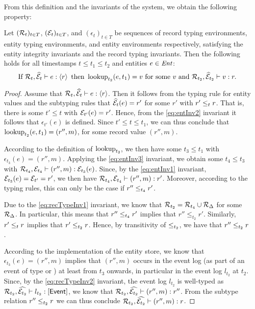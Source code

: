 From this definition and the invariants of the system, we obtain the
following property:
\begin{corollary}\label{cor:lookup}
  Let $({\mathcal R}_t)_{t\in T}$, $({\mathcal E}_t)_{t\in T}$, and
  $(\epsilon_t)_{t\in T}$ be sequences of record typing
  environments, entity typing environments, and entity environments
  respectively, satisfying the entity integrity invariants and the
  record typing invariants. Then the following holds for all
  timestamps $t \le t_1 \le t_2$ and entities $e \in \mathit{Ent}$:
  \[
  \text{If } {\mathcal R}_t, \widehat{{\mathcal E}}_t \vdash e : \left\langle r\right\rangle \text{
    then } \operatorname{lookup}_{t_2}(e,t_1) = v \text{ for some } v \text{ and
  } {\mathcal R}_{t_2}, \widehat{{\mathcal E}}_{t_2} \vdash v : r.
  \]
\end{corollary}
\begin{proof}
  Assume that ${\mathcal R}_t, \widehat{{\mathcal E}}_t \vdash e : \left\langle r\right\rangle$. Then
  it follows from the typing rule for entity values and the subtyping
  rules that $\widehat{{\mathcal E}}_t(e) = r'$ for some $r'$ with $r' \le_{t}
  r$. That is, there is some $t' \le t$ with ${\mathcal E}_{t'}(e) =
  r'$. Hence, from the \ref{eq:entInv2} invariant it follows that
  $\epsilon_{t'}(e)$ is defined. Since $t' \le t \le t_1$, we can thus
  conclude that $\operatorname{lookup}_{t_2}(e,t_1) = (r'',m)$, for some record
  value $(r'',m)$.

  According to the definition of $\operatorname{lookup}_{t_2}$, we then have some
  $t_3 \le t_1$ with $\epsilon_{t_3}(e) = (r'',m)$. Applying the
  \ref{eq:entInv3} invariant, we obtain some $t_4 \le t_3$ with
  ${\mathcal R}_{t_4}, {\mathcal E}_{t_4} \vdash (r'',m) : {\mathcal E}_{t_3}(e)$. Since,
  by the \ref{eq:entInv1} invariant, ${\mathcal E}_{t_3}(e) = {\mathcal E}_{t'}
  =r'$, we then have
  ${\mathcal R}_{t_4}, {\mathcal E}_{t_4} \vdash (r'',m) : r'$. Moreover,
  according to the typing rules, this can only be the case if $r''
  \le_{t_4} r'$.

  Due to the \ref{eq:recTypeInv1} invariant, we know that ${\mathcal R}_{t_2}
  = {\mathcal R}_{t_4} \cup {\mathcal R}_\Delta$ for some ${\mathcal R}_\Delta$. In
  particular, this means that $r'' \le_{t_4} r'$ implies that $r''
  \le_{t_2} r'$. Similarly, $r' \le_{t} r$ implies that $r'
  \le_{t_2} r$. Hence, by transitivity of ${\le_{t_2}}$, we have
  that $r'' \le_{t_2} r$.

  According to the implementation of the entity store, we know that
  $\epsilon_{t_3}(e) = (r'',m)$ implies that $(r'',m)$ occurs in the
  event log (as part of an event of type  or
  ) at least from $t_3$ onwards, in
  particular in the event log $l_{t_2}$ at $t_2$. Since, by the
  \ref{eq:recTypeInv2} invariant, the event log $l_{t_2}$ is
  well-typed as
  ${\mathcal R}_{t_2}, \widehat{{\mathcal E}_{t_2}} \vdash l_{t_2} : \left[\mathsf{Event}\right]$,
  we know that
  ${\mathcal R}_{t_2}, \widehat{{\mathcal E}_{t_2}} \vdash (r'',m) : r''$. From
  the subtype relation $r'' \le_{t_2} r$ we can thus conclude
  ${\mathcal R}_{t_2}, \widehat{{\mathcal E}_{t_2}} \vdash (r'',m) : r$.
\end{proof}

